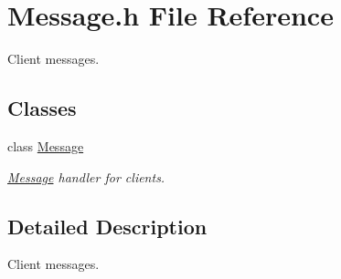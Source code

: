 \hypertarget{a00115}{\section{Message.\-h File Reference}
\label{a00115}
}


Client messages.  


\subsection*{Classes}
\begin{DoxyCompactItemize}
\item 
class \hyperlink{a00047}{Message}
\begin{DoxyCompactList}\small\item\em \hyperlink{a00047}{Message} handler for clients. \end{DoxyCompactList}\end{DoxyCompactItemize}


\subsection{Detailed Description}
Client messages. 